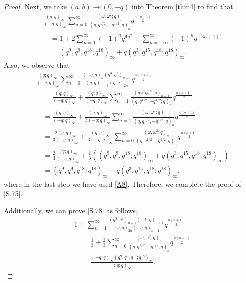\documentclass[10pt,a4paper]{amsart}
\begin{document}
\begin{proof}
Next,  we take $\left(a,b\right)\to\left(0,-q\right)$ into Theorem \ref{thm4} to find that 
\begin{align}
&\frac{\left(q;q\right)_{\infty}}{\left(-q;q\right)_{\infty}}
\sum_{n=0}^{\infty}\frac{\left(\omega,\omega^2;q\right)_n}
{\left(q,q^{1/2},-q^{1/2};q\right)_n}
q^{\frac{n\left(n+1\right)}{2}}\nonumber\\
&\quad=1+2\sum_{n=1}^{\infty}\left(-1\right)^nq^{9n^2}
+\sum_{n=-\infty}^{\infty}\left(-1\right)^nq^{\left(3n+1\right)^2}\nonumber\\
&\quad=\left(q^9,q^9,q^{18};q^{18}\right)_{\infty}
+q\left(q^3,q^{15},q^{18};q^{18}\right)_{\infty}.\label{A4}
\end{align}
Also, we observe that
\begin{align}
&\frac{\left(q;q\right)_{\infty}}{\left(-q;q\right)_{\infty}}\sum_{n=0}^{\infty}\frac{\left(-q;q\right)_n\left(q^3;q^3\right)_{n-1}
}
{\left(q;q\right)_{n-1}\left(q;q\right)_{2n}}q^{\frac{n(n+1)}{2}}\nonumber\\
&\quad=\frac{\left(q;q\right)_{\infty}}{\left(-q;q\right)_{\infty}}+\frac{\left(q;q\right)_{\infty}}{\left(-q;q\right)_{\infty}}\sum_{n=1}^{\infty}\frac{\left(q\omega,q\omega^2;q\right)_{n-1}}
{\left(q,q^{1/2},-q^{1/2};q\right)_n}q^{\frac{n\left(n+1\right)}{2}}\nonumber\\
&\quad=\frac{\left(q;q\right)_{\infty}}{\left(-q;q\right)_{\infty}}+\frac{\left(q;q\right)_{\infty}}{3\left(-q;q\right)_{\infty}}\sum_{n=1}^{\infty}\frac{\left(\omega,\omega^2;q\right)_{n}}
{\left(q,q^{1/2},-q^{1/2};q\right)_n}q^{\frac{n\left(n+1\right)}{2}}\nonumber\\
&\quad=\frac{2\left(q;q\right)_{\infty}}{3\left(-q;q\right)_{\infty}}+\frac{\left(q;q\right)_{\infty}}{3\left(-q;q\right)_{\infty}}\sum_{n=0}^{\infty}
\frac{\left(\omega,\omega^2;q\right)_{n}}
{\left(q,q^{1/2},-q^{1/2};q\right)_n}q^{\frac{n\left(n+1\right)}{2}}\nonumber\\
&\quad=\frac{2}{3}\frac{\left(q;q\right)_{\infty}}{\left(-q;q\right)_{\infty}}
+\frac{1}{3}\left(\left(q^9,q^9,q^{18};q^{18}\right)_{\infty}
+q\left(q^3,q^{15},q^{18};q^{18}\right)_{\infty}
\right)\nonumber\\
&\quad=\left(q^9,q^9,q^{18};q^{18}\right)_{\infty}
-q\left(q^3,q^{15},q^{18};q^{18}\right)_{\infty},\nonumber
\end{align}
where in the last step we have used \eqref{A8}.
Therefore, we complete the proof of \eqref{S.75}.

Additionally, we can prove \eqref{S.78} as follows,
\begin{align*}
&1+\sum_{n=1}^{\infty}\frac{\left(q^3;q^3\right)_{n-1}\left(-1;q\right)_{n+1}}
{\left(q;q\right)_{2n}\left(-q;q\right)_{n-1}}q^{\frac{n(n+1)}{2}}\\
&\quad=
\frac{1}{3}+\frac{2}{3}\sum_{n=0}^{\infty}\frac{\left(\omega,\omega^2;q\right)_n}{\left(q,q^{1/2},-q^{1/2};q\right)_n}q^{\frac{n(n+1)}{2}}
\\
&\quad=\frac{\left(-q;q\right)_{\infty}\left(q^9,q^9,q^{18};q^{18}\right)_{\infty}}{\left(q;q\right)_{\infty}}.
\end{align*}




\end{proof}
\end{document}
